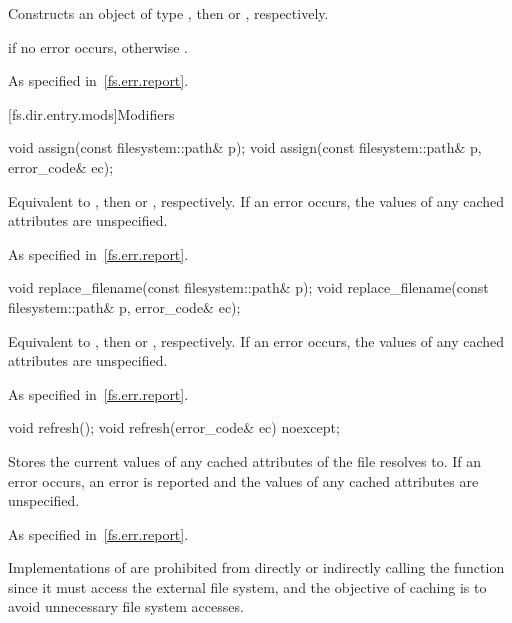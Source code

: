 \begin{itemdescr}
\pnum
\effects
Constructs an object of type ,
then  or , respectively.

\pnum
\ensures
{} if no error occurs,
otherwise .

\pnum
\throws
As specified in~\ref{fs.err.report}.
\end{itemdescr}

[fs.dir.entry.mods]{Modifiers}

%
\begin{itemdecl}
void assign(const filesystem::path& p);
void assign(const filesystem::path& p, error_code& ec);
\end{itemdecl}

\begin{itemdescr}
\pnum
\effects
Equivalent to ,
then  or , respectively.
If an error occurs, the values of any cached attributes are unspecified.

\pnum
\throws
As specified in~\ref{fs.err.report}.
\end{itemdescr}

%
\begin{itemdecl}
void replace_filename(const filesystem::path& p);
void replace_filename(const filesystem::path& p, error_code& ec);
\end{itemdecl}

\begin{itemdescr}
\pnum
\effects
Equivalent to ,
then  or , respectively.
If an error occurs, the values of any cached attributes are unspecified.

\throws
As specified in~\ref{fs.err.report}.
\end{itemdescr}

%
\begin{itemdecl}
void refresh();
void refresh(error_code& ec) noexcept;
\end{itemdecl}

\begin{itemdescr}
\pnum
\effects
Stores the current values of any cached attributes of the file  resolves to.
If an error occurs, an error is reported
and the values of any cached attributes are unspecified.

\pnum
\throws
As specified in~\ref{fs.err.report}.

\pnum
\begin{note}
Implementations of 
are prohibited from directly or indirectly calling the  function
since it must access the external file system,
and the objective of caching is to avoid unnecessary file system accesses.
\end{note}
\end{itemdescr}

